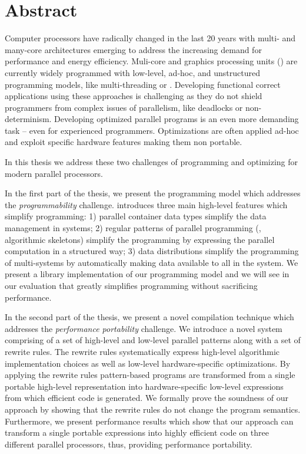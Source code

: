 \chapter*{Abstract}\label{abstract}

Computer processors have radically changed in the last 20 years with multi- and many-core architectures emerging to address the increasing demand for performance and energy efficiency.
Muli-core \CPUs and graphics processing units (\GPUs) are currently widely programmed with low-level, ad-hoc, and unstructured programming models, like multi-threading or \OpenCL.
Developing functional correct applications using these approaches is challenging as they do not shield programmers from complex issues of parallelism, like deadlocks or non-determinism.
Developing optimized parallel programs is an even more demanding task -- even for experienced programmers.
Optimizations are often applied ad-hoc and exploit specific hardware features making them non portable.

In this thesis we address these two challenges of programming and optimizing for modern parallel processors.

In the first part of the thesis, we present the \SkelCL programming model which addresses the \emph{programmability} challenge.
\SkelCL introduces three main high-level features which simplify \GPU programming:
1) parallel container data types simplify the data management in \GPU systems;
2) regular patterns of parallel programming (\aka, algorithmic skeletons) simplify the programming by expressing the parallel computation in a structured way;
3) data distributions simplify the programming of multi-\GPU systems by automatically making data available to all \GPUs in the system.
We present a \Cpp library implementation of our programming model and we will see in our evaluation that \SkelCL greatly simplifies \GPU programming without sacrificing performance.

In the second part of the thesis, we present a novel compilation technique which addresses the \emph{performance portability} challenge.
We introduce a novel system comprising of a set of high-level and low-level parallel patterns along with a set of rewrite rules.
The rewrite rules systematically express high-level algorithmic implementation choices as well as low-level hardware-specific optimizations.
By applying the rewrite rules pattern-based programs are transformed from a single portable high-level representation into hardware-specific low-level expressions from which efficient \OpenCL code is generated.
We formally prove the soundness of our approach by showing that the rewrite rules do not change the program semantics.
Furthermore, we present performance results which show that our approach can transform a single portable expressions into highly efficient code on three different parallel processors, thus, providing performance portability.

